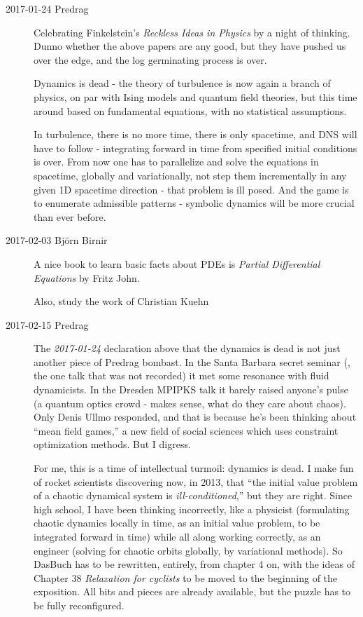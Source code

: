 \begin{description}
\item[2017-01-24 Predrag] Celebrating Finkelstein's
{\em Reckless Ideas in Physics}
by a night of thinking. Dunno whether the above papers are any good, but
they have pushed us over the edge, and the log germinating process is
over.

Dynamics is dead - the theory of turbulence is now again a branch of
physics, on par with Ising models and quantum field theories, but this
time around based on fundamental equations, with no statistical
assumptions.

In turbulence, there
is no more time, there is only spacetime, and DNS will have to follow -
integrating forward in time from specified initial conditions is over.
From now one has to parallelize and solve the equations in spacetime,
globally and variationally, not step them incrementally in any given 1D
spacetime direction - that problem is ill posed. And the game is to
enumerate admissible patterns - symbolic dynamics will be more crucial
than ever before.

\item[2017-02-03 Bj\"orn Birnir] A nice book to learn basic facts about
PDEs is {\em Partial Differential Equations} by Fritz John.

Also, study the work of
 {Christian Kuehn}



\item[2017-02-15 Predrag]
The {\em 2017-01-24} declaration above that the dynamics is dead is not
just another piece of Predrag bombast. In the Santa Barbara secret
seminar (\ie, the one talk that was not recorded) it met some resonance
with fluid dynamicists. In the Dresden MPIPKS talk it barely raised
anyone's pulse (a quantum optics crowd - makes sense, what do they care
about chaos). Only Denis Ullmo responded, and that is because he's been
thinking about ``mean field games,'' a new field of social sciences which
uses constraint optimization methods. But I digress.

For me, this is a time of intellectual turmoil: dynamics is dead. I make
fun of rocket scientists discovering now, in 2013, that ``the
initial value problem of a chaotic dynamical system is
\emph{ill-conditioned},'' but they are right.
Since high school, I have been thinking incorrectly, like a physicist
(formulating chaotic dynamics locally in time, as an initial value
problem, to be integrated forward in time) while all along working
correctly, as an engineer (solving for chaotic orbits globally, by
variational methods). So DasBuch has to be rewritten, entirely, from
chapter 4 on, with the ideas of Chapter 38 {\em Relaxation for cyclists}
to be moved to the beginning of the exposition. All bits and pieces are
already available, but the puzzle has to be fully reconfigured.


\end{description}

